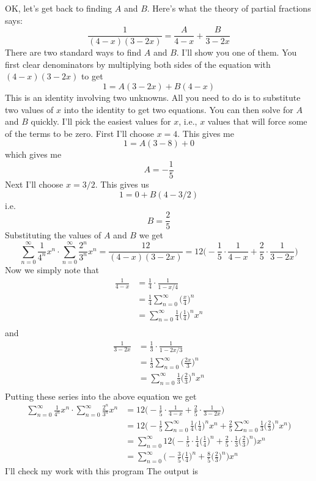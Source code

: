 OK, let's get back to finding $A$ and $B$.
Here's what the theory of partial fractions says:
\[
\frac{1}{(4-x)(3-2x)}
=
\frac{A}{4-x} +
\frac{B}{3-2x}
\]
There are two standard ways to find $A$ and $B$.
I'll show you one of them.
You first clear denominators by multiplying both sides
of the equation with $(4-x)(3-2x)$ to get
\[
1
=
A(3 - 2x) +
B(4 - x)
\]
This is an identity involving two unknowns.
All you need to do is to substitute two values of $x$ into the 
identity to get two equations.
You can then solve for $A$ and $B$ quickly.
I'll pick the easiest values for $x$,
i.e., $x$ values that will force some of the terms to be zero.
First I'll choose $x = 4$.
This gives me
\[
1 = A(3 - 8) + 0
\]
which gives me
\[
A = -\frac{1}{5}
\]
Next I'll choose $x = 3/2$.
This gives us
\[
1 = 0 + B(4 - 3/2)
\]
i.e.
\[
B = \frac{2}{5}
\]
Substituting the values of $A$ and $B$ we get
\[
\sum_{n=0}^\infty \frac{1}{4^n} x^n 
\cdot 
\sum_{n=0}^\infty \frac{2^n}{3^n} x^n 
= \frac{12}{(4-x)(3-2x)} 
= 12 \biggl( 
-\frac{1}{5} \cdot \frac{1}{4-x} +
\frac{2}{5}\cdot \frac{1}{3-2x}
\biggr)
\]
Now we simply note that
\begin{align*}
\frac{1}{4-x} 
&= \frac{1}{4} \cdot \frac{1}{1 - x/4}  \\
&= \frac{1}{4} \sum_{n=0}^\infty \biggl(\frac{x}{4} \biggr)^n \\
&= \sum_{n=0}^\infty \frac{1}{4} \biggl( \frac{1}{4} \biggr)^n x^n\\
\end{align*}
and
\begin{align*}
\frac{1}{3-2x} 
&= \frac{1}{3} \cdot \frac{1}{1 - 2x/3}  \\
&= \frac{1}{3} \sum_{n=0}^\infty \biggl(\frac{2x}{3} \biggr)^n \\
&= \sum_{n=0}^\infty \frac{1}{3} \biggl( \frac{2}{3} \biggr)^n x^n\\
\end{align*}
Putting these series into the above equation we get
\begin{align*}
\sum_{n=0}^\infty \frac{1}{4^n} x^n 
\cdot 
\sum_{n=0}^\infty \frac{2^n}{3^n} x^n  
&= 
12 \biggl( 
-\frac{1}{5} \cdot \frac{1}{4-x} +
\frac{2}{5} \cdot \frac{1}{3-2x}
\biggr) \\
&=
12 \biggl( 
-\frac{1}{5}  \sum_{n=0}^\infty \frac{1}{4} \biggl( \frac{1}{4} \biggr)^n x^n +
\frac{2}{5}  \sum_{n=0}^\infty \frac{1}{3} \biggl( \frac{2}{3} \biggr)^n x^n
\biggr) \\
&=
\sum_{n=0}^\infty 
12 \biggl( 
-\frac{1}{5} \cdot \frac{1}{4} \biggl( \frac{1}{4} \biggr)^n +
\frac{2}{5} \cdot \frac{1}{3} \biggl( \frac{2}{3} \biggr)^n
\biggr) x^n\\
&=
\sum_{n=0}^\infty 
\biggl( 
-\frac{3}{5} \biggl( \frac{1}{4} \biggr)^n +
\frac{8}{5} \biggl( \frac{2}{3} \biggr)^n
\biggr) x^n
\end{align*}
I'll check my work with this program
The output is

